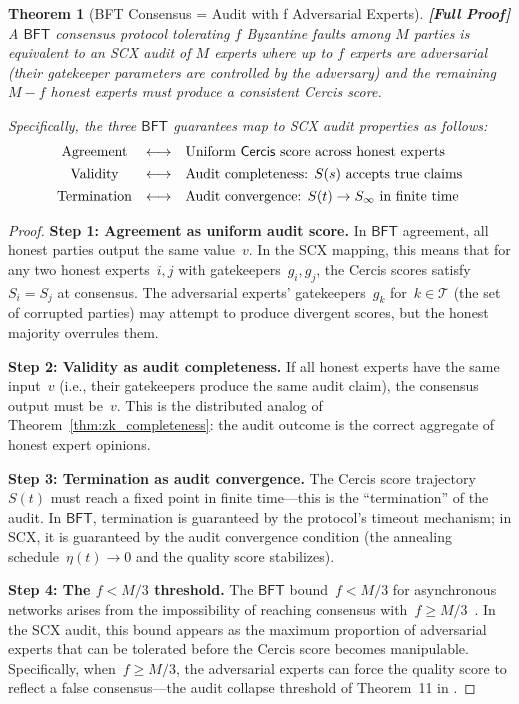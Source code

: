 \documentclass[12pt,a4paper]{article}
\newtheorem{theorem}{Theorem}[section]
\theoremstyle{remark}
\newcommand{\T}{\mathcal{T}}
\newcommand{\SCX}{\textsf{SCX}}
\newcommand{\Cercis}{\textsf{Cercis}}
\newcommand{\BFT}{\textsf{BFT}}
\newcommand{\rigorFull}{\textbf{[Full Proof]}}
\begin{document}
\begin{theorem}[BFT Consensus = Audit with f Adversarial Experts]
\label{thm:bft_consensus}
\rigorFull
A $\BFT$ consensus protocol tolerating $f$ Byzantine faults among $M$ parties is equivalent to an \SCX{} audit of $M$ experts where up to $f$ experts are adversarial (their gatekeeper parameters are controlled by the adversary) and the remaining $M-f$ honest experts must produce a consistent \Cercis{} score.

Specifically, the three $\BFT$ guarantees map to \SCX{} audit properties as follows:
\begin{equation}
  \begin{array}{ccl}
    \text{Agreement} &\longleftrightarrow& \text{Uniform \Cercis{} score across honest experts}\\[4pt]
    \text{Validity} &\longleftrightarrow& \text{Audit completeness: } S(s) \text{ accepts true claims}\\[4pt]
    \text{Termination} &\longleftrightarrow& \text{Audit convergence: } S(t) \to S_{\infty} \text{ in finite time}
  \end{array}
\end{equation}
\end{theorem}

\begin{proof}
\noindent\textbf{Step 1: Agreement as uniform audit score.}
In $\BFT$ agreement, all honest parties output the same value~$v$. In the \SCX{} mapping, this means that for any two honest experts~$i, j$ with gatekeepers~$g_i, g_j$, the \Cercis{} scores satisfy~$S_i = S_j$ at consensus. The adversarial experts' gatekeepers~$g_k$ for~$k \in \T$ (the set of corrupted parties) may attempt to produce divergent scores, but the honest majority overrules them.

\smallskip
\noindent\textbf{Step 2: Validity as audit completeness.}
If all honest experts have the same input~$v$ (i.e., their gatekeepers produce the same audit claim), the consensus output must be~$v$. This is the distributed analog of Theorem~\ref{thm:zk_completeness}: the audit outcome is the correct aggregate of honest expert opinions.

\smallskip
\noindent\textbf{Step 3: Termination as audit convergence.}
The \Cercis{} score trajectory~$S(t)$ must reach a fixed point in finite time---this is the ``termination'' of the audit. In $\BFT$, termination is guaranteed by the protocol's timeout mechanism; in \SCX{}, it is guaranteed by the audit convergence condition (the annealing schedule~$\eta(t) \to 0$ and the quality score stabilizes).

\smallskip
\noindent\textbf{Step 4: The $f < M/3$ threshold.}
The $\BFT$ bound~$f < M/3$ for asynchronous networks arises from the impossibility of reaching consensus with~$f \geq M/3$~\cite{bracha1987asynchronous}. In the \SCX{} audit, this bound appears as the maximum proportion of adversarial experts that can be tolerated before the \Cercis{} score becomes manipulable. Specifically, when~$f \geq M/3$, the adversarial experts can force the quality score to reflect a false consensus---the audit collapse threshold of Theorem~11 in \cite{scx_theory}.
\end{proof}
\end{document}
